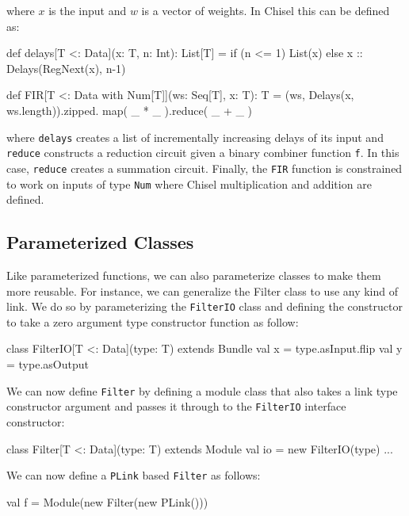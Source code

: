 \documentclass[twocolumn,10pt]{article}
\def\code#1{{\tt #1}}
\begin{document}
\noindent 
where $x$ is the input and $w$ is a vector of weights.
In Chisel this can be defined as:

\begin{scala}
def delays[T <: Data](x: T, n: Int): List[T] = 
  if (n <= 1) List(x) else x :: Delays(RegNext(x), n-1)

def FIR[T <: Data with Num[T]](ws: Seq[T], x: T): T = 
  (ws, Delays(x, ws.length)).zipped.
    map( _ * _ ).reduce( _ + _ )
\end{scala}
 
\noindent
where 
\code{delays} creates a list of incrementally increasing delays of its input and
\code{reduce} constructs a reduction circuit given a binary combiner function \code{f}.  
In this case, \code{reduce} creates a summation circuit.
Finally, the \code{FIR} function is constrained to work on inputs of type \code{Num} where Chisel multiplication and addition are defined.

\subsection{Parameterized Classes}

Like parameterized functions, we can also parameterize classes to make them more reusable.
For instance, we can generalize the Filter class to use any kind of link.  
We do so by parameterizing the \verb+FilterIO+ class and defining the constructor to take a zero argument type constructor function as follow:

\begin{scala}
class FilterIO[T <: Data](type: T) extends Bundle { 
  val x = type.asInput.flip
  val y = type.asOutput
}
\end{scala}

\noindent
We can now define \verb+Filter+ by defining a module class that also takes a link type constructor argument and passes it through to the \verb+FilterIO+ interface constructor:

\begin{scala}
class Filter[T <: Data](type: T) extends Module { 
  val io = new FilterIO(type)
  ...
}
\end{scala}

\noindent
We can now define a \verb+PLink+ based \verb+Filter+ as follows:
\begin{scala}
val f = Module(new Filter(new PLink()))
\end{scala}
\end{document}
